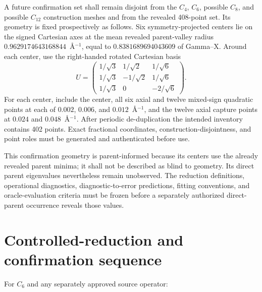 \documentclass[11pt]{article}
\begin{document}
A future confirmation set shall remain disjoint from the $C_4$, $C_6$, possible $C_8$,
and possible $C_{12}$ construction meshes and from the revealed 408-point set.  Its geometry is fixed
prospectively as follows.  Six symmetry-projected centers lie on the signed Cartesian
axes at the mean revealed parent-valley radius
$0.9629174643168844$~\AA$^{-1}$, equal to $0.8381689694043609$ of Gamma--X.  Around each
center, use the right-handed rotated Cartesian basis
\begin{equation}
 U=\begin{pmatrix}
 1/\sqrt{3} &  1/\sqrt{2} &  1/\sqrt{6} \\
 1/\sqrt{3} & -1/\sqrt{2} &  1/\sqrt{6} \\
 1/\sqrt{3} &  0           & -2/\sqrt{6}
 \end{pmatrix}.
\end{equation}
For each center, include the center, all six axial and twelve mixed-sign quadratic
points at each of $0.002$, $0.006$, and $0.012$~\AA$^{-1}$, and the twelve axial capture
points at $0.024$ and $0.048$~\AA$^{-1}$.  After periodic de-duplication the intended
inventory contains 402 points.  Exact fractional coordinates, construction-disjointness,
and point roles must be generated and authenticated before use.

This confirmation geometry is parent-informed because its centers use the already
revealed parent minima; it shall not be described as blind to geometry.  Its direct
parent eigenvalues nevertheless remain unobserved.  The reduction definitions,
operational diagnostics, diagnostic-to-error predictions, fitting conventions, and
oracle-evaluation criteria must be frozen before a separately authorized direct-parent
occurrence reveals those values.

\section{Controlled-reduction and confirmation sequence}

For $C_6$ and any separately approved source operator:
\end{document}
